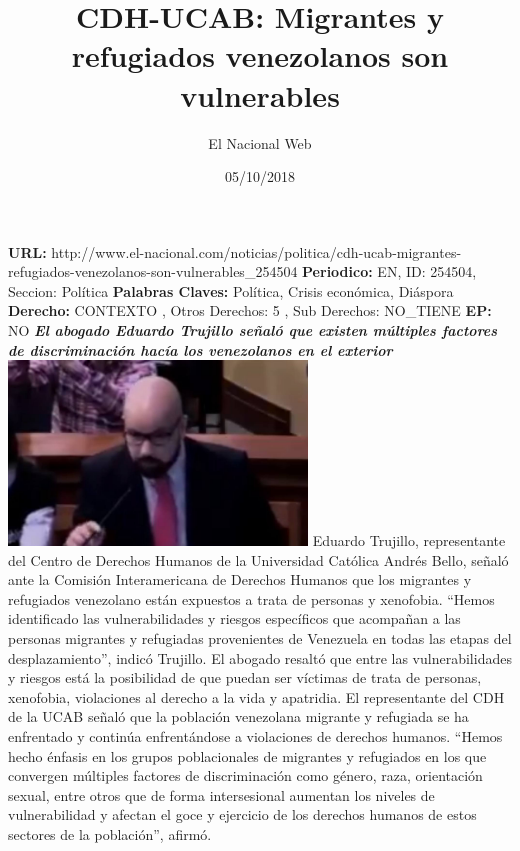 \documentclass{article}%
\title{\textbf{CDH{-}UCAB: Migrantes y refugiados venezolanos son vulnerables}}%
\author{El Nacional Web}%
\date{05/10/2018}%
\begin{document}
%
\normalsize%
\maketitle%
\textbf{URL: }%
http://www.el{-}nacional.com/noticias/politica/cdh{-}ucab{-}migrantes{-}refugiados{-}venezolanos{-}son{-}vulnerables\_254504\newline%
%
\textbf{Periodico: }%
EN, %
ID: %
254504, %
Seccion: %
Política\newline%
%
\textbf{Palabras Claves: }%
Política, Crisis económica, Diáspora\newline%
%
\textbf{Derecho: }%
CONTEXTO%
, Otros Derechos: %
5%
, Sub Derechos: %
NO\_TIENE%
\newline%
%
\textbf{EP: }%
NO\newline%
\newline%
%
\textbf{\textit{El abogado Eduardo Trujillo señaló que existen múltiples factores de discriminación hacía los venezolanos en el exterior~}}%
\newline%
\newline%
%
\includegraphics[width=300px]{100.jpg}%
\newline%
%
Eduardo Trujillo, representante del Centro de Derechos Humanos de la Universidad Católica Andrés Bello, señaló ante la Comisión Interamericana de Derechos Humanos que los migrantes y refugiados venezolano están expuestos a trata de personas y xenofobia.%
\newline%
%
“Hemos identificado las vulnerabilidades y riesgos específicos que acompañan a las personas migrantes y refugiadas provenientes de Venezuela en todas las etapas del desplazamiento”, indicó Trujillo.%
\newline%
%
El abogado resaltó que entre las vulnerabilidades y riesgos está la posibilidad de que puedan ser víctimas de trata de personas, xenofobia, violaciones al derecho a la vida y apatridia.%
\newline%
%
El representante del CDH de la UCAB señaló que la población venezolana migrante y refugiada se ha enfrentado y continúa enfrentándose a violaciones de derechos humanos.%
\newline%
%
“Hemos hecho énfasis en los grupos poblacionales de migrantes y refugiados en los que convergen múltiples factores de discriminación como género, raza, orientación sexual, entre otros que de forma intersesional aumentan los niveles de vulnerabilidad y afectan el goce y ejercicio de los derechos humanos de estos sectores de la población”, afirmó.%
\newline%
%
\end{document}
